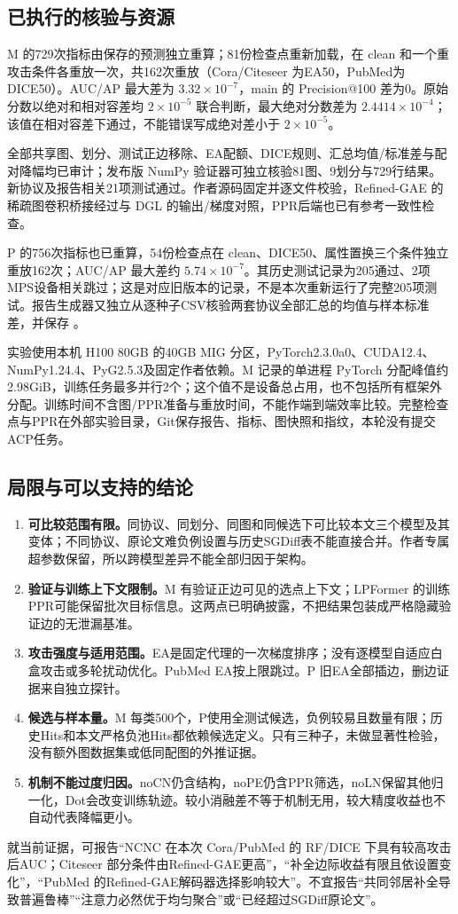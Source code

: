 \subsection{已执行的核验与资源}
M 的729次指标由保存的预测独立重算；81份检查点重新加载，在 clean 和一个重攻击条件各重放一次，共162次重放（Cora/Citeseer 为EA50，PubMed为DICE50）。AUC/AP 最大差为 $3.32\times10^{-7}$，main 的 Precision@100 差为0。原始分数以绝对和相对容差均 $2\times10^{-5}$ 联合判断，最大绝对分数差为 $2.4414\times10^{-4}$；该值在相对容差下通过，不能错误写成绝对差小于 $2\times10^{-5}$。

全部共享图、划分、测试正边移除、EA配额、DICE规则、汇总均值/标准差与配对降幅均已审计；发布版 NumPy 验证器可独立核验81图、9划分与729行结果。新协议及报告相关21项测试通过。作者源码固定并逐文件校验，Refined-GAE 的稀疏图卷积桥接经过与 DGL 的输出/梯度对照，PPR后端也已有参考一致性检查。

P 的756次指标也已重算，54份检查点在 clean、DICE50、属性置换三个条件独立重放162次；AUC/AP 最大差约 $5.74\times10^{-7}$。其历史测试记录为205通过、2项MPS设备相关跳过；这是对应旧版本的记录，不是本次重新运行了完整205项测试。报告生成器又独立从逐种子CSV核验两套协议全部汇总的均值与样本标准差，并保存 。

实验使用本机 H100 80GB 的40GB MIG 分区，PyTorch2.3.0a0、CUDA12.4、NumPy1.24.4、PyG2.5.3及固定作者依赖。M 记录的单进程 PyTorch 分配峰值约2.98GiB，训练任务最多并行2个；这个值不是设备总占用，也不包括所有框架外分配。训练时间不含图/PPR准备与重放时间，不能作端到端效率比较。完整检查点与PPR在外部实验目录，Git保存报告、指标、图快照和指纹，本轮没有提交ACP任务。

\subsection{局限与可以支持的结论}
\begin{enumerate}
\item \textbf{可比较范围有限。}同协议、同划分、同图和同候选下可比较本文三个模型及其变体；不同协议、原论文难负例设置与历史SGDiff表不能直接合并。作者专属超参数保留，所以跨模型差异不能全部归因于架构。
\item \textbf{验证与训练上下文限制。}M 有验证正边可见的选点上下文；LPFormer 的训练PPR可能保留批次目标信息。这两点已明确披露，不把结果包装成严格隐藏验证边的无泄漏基准。
\item \textbf{攻击强度与适用范围。}EA是固定代理的一次梯度排序；没有逐模型自适应白盒攻击或多轮扰动优化。PubMed EA按上限跳过。P 旧EA全部插边，删边证据来自独立探针。
\item \textbf{候选与样本量。}M 每类500个，P使用全测试候选，负例较易且数量有限；历史Hits和本文严格负池Hits都依赖候选定义。只有三种子，未做显著性检验，没有额外图数据集或低同配图的外推证据。
\item \textbf{机制不能过度归因。}noCN仍含结构，noPE仍含PPR筛选，noLN保留其他归一化，Dot会改变训练轨迹。较小消融差不等于机制无用，较大精度收益也不自动代表降幅更小。
\end{enumerate}
就当前证据，可报告“NCNC 在本次 Cora/PubMed 的 RF/DICE 下具有较高攻击后AUC；Citeseer 部分条件由Refined-GAE更高”，“补全边际收益有限且依设置变化”，“PubMed 的Refined-GAE解码器选择影响较大”。不宜报告“共同邻居补全导致普遍鲁棒”“注意力必然优于均匀聚合”或“已经超过SGDiff原论文”。

